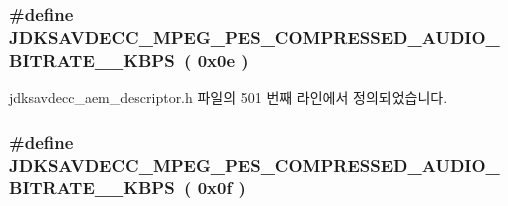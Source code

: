 \subsubsection[{\texorpdfstring{J\+D\+K\+S\+A\+V\+D\+E\+C\+C\+\_\+\+M\+P\+E\+G\+\_\+\+P\+E\+S\+\_\+\+C\+O\+M\+P\+R\+E\+S\+S\+E\+D\+\_\+\+A\+U\+D\+I\+O\+\_\+\+B\+I\+T\+R\+A\+T\+E\+\_\+192\+\_\+\+K\+B\+PS}{JDKSAVDECC_MPEG_PES_COMPRESSED_AUDIO_BITRATE_192_KBPS}}]{\setlength{\rightskip}{0pt plus 5cm}\#define J\+D\+K\+S\+A\+V\+D\+E\+C\+C\+\_\+\+M\+P\+E\+G\+\_\+\+P\+E\+S\+\_\+\+C\+O\+M\+P\+R\+E\+S\+S\+E\+D\+\_\+\+A\+U\+D\+I\+O\+\_\+\+B\+I\+T\+R\+A\+T\+E\+\_\+\_\+\+K\+B\+PS~( 0x0e )}\hypertarget{group__mpeg__pes__compressed__audio__bitrate_ga63ba8c68a09ac6b6297fe36c8d4579d3}{}\label{group__mpeg__pes__compressed__audio__bitrate_ga63ba8c68a09ac6b6297fe36c8d4579d3}


jdksavdecc\+\_\+aem\+\_\+descriptor.\+h 파일의 501 번째 라인에서 정의되었습니다.

\subsubsection[{\texorpdfstring{J\+D\+K\+S\+A\+V\+D\+E\+C\+C\+\_\+\+M\+P\+E\+G\+\_\+\+P\+E\+S\+\_\+\+C\+O\+M\+P\+R\+E\+S\+S\+E\+D\+\_\+\+A\+U\+D\+I\+O\+\_\+\+B\+I\+T\+R\+A\+T\+E\+\_\+224\+\_\+\+K\+B\+PS}{JDKSAVDECC_MPEG_PES_COMPRESSED_AUDIO_BITRATE_224_KBPS}}]{\setlength{\rightskip}{0pt plus 5cm}\#define J\+D\+K\+S\+A\+V\+D\+E\+C\+C\+\_\+\+M\+P\+E\+G\+\_\+\+P\+E\+S\+\_\+\+C\+O\+M\+P\+R\+E\+S\+S\+E\+D\+\_\+\+A\+U\+D\+I\+O\+\_\+\+B\+I\+T\+R\+A\+T\+E\+\_\+\_\+\+K\+B\+PS~( 0x0f )}\hypertarget{group__mpeg__pes__compressed__audio__bitrate_ga5961692f268ad1b2e829576625923f9d}{}\label{group__mpeg__pes__compressed__audio__bitrate_ga5961692f268ad1b2e829576625923f9d}


